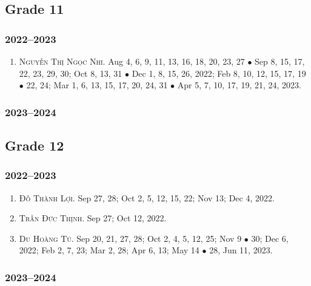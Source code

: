\documentclass{article}
\begin{document}
\subsection{Grade 11}

\subsubsection{2022--2023}

\begin{enumerate}
	\item \textsc{Nguyễn Thị Ngọc Nhi.} {\sf[In]} Aug 4, 6, 9, 11, 13, 16, 18, 20, 23, 27 $\bullet$ Sep 8, 15, 17, 22, 23, 29, 30; Oct 8, 13, 31 $\bullet$ Dec 1, 8,  15, 26, 2022; Feb 8, 10, 12, 15, 17, 19 $\bullet$ 22, 24; Mar 1, 6, 13, 15, 17, 20, 24, 31 $\bullet$ Apr 5, 7, 10, 17, 19, 21, 24, 2023.
\end{enumerate}

\subsubsection{2023--2024}


\subsection{Grade 12}

\subsubsection{2022--2023}

\begin{enumerate}
	\item \textsc{Đỗ Thành Lợi.} {\sf[In]} Sep 27, 28; Oct 2, 5, 12, 15, 22; Nov 13; Dec 4, 2022. {\sf[Out]}
	\item \textsc{Trần Đức Thịnh.} {\sf[In]} Sep 27; Oct 12, 2022. {\sf[Out]}
	\item \textsc{Du Hoàng Tú.} {\sf[In]} Sep 20, 21, 27, 28; Oct 2, 4, 5, 12, 25; Nov 9 $\bullet$ 30; Dec 6, 2022; Feb 2, 7, 23; Mar 2, 28; Apr 6, 13; May 14 $\bullet$ 28, Jun 11, 2023. {\sf[Out]}
\end{enumerate}

\subsubsection{2023--2024}
\end{document}
